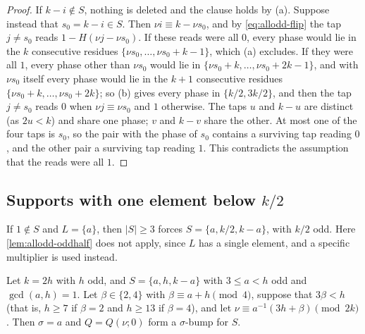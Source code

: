 \begin{proof}
If $k-i\notin S$, nothing is deleted and the clause holds by (a). Suppose
instead that $s_0=k-i\in S$. Then $\nu i\equiv k-\nu s_0$, and by
\eqref{eq:allodd-flip} the tap $j\ne s_0$ reads $1-H(\nu j-\nu s_0)$. If these reads
were all $0$, every phase would lie in the $k$ consecutive residues
$\{\nu s_0,\dots,\nu s_0+k-1\}$, which (a) excludes. If they were all $1$,
every phase other than $\nu s_0$ would lie in
$\{\nu s_0+k,\dots,\nu s_0+2k-1\}$, and with $\nu s_0$ itself every phase would lie in
the $k+1$ consecutive residues $\{\nu s_0+k,\dots,\nu s_0+2k\}$; so (b) gives
every phase in $\{k/2,3k/2\}$, and then the tap $j\ne s_0$ reads $0$ when
$\nu j\equiv \nu s_0$ and $1$ otherwise. The taps $u$ and $k-u$ are distinct (as
$2u<k$) and share one phase; $v$ and $k-v$ share the other. At most one of the
four taps is $s_0$, so the pair with the phase of $s_0$ contains a surviving
tap reading $0$, and the other pair a surviving tap reading $1$. This
contradicts the assumption that the reads were all $1$.
\end{proof}

\subsection{Supports with one element below \texorpdfstring{$k/2$}{k/2}}
\label{sec:allodd-three}

If $1\notin S$ and $L=\{a\}$, then $|S|\ge3$ forces $S=\{a,k/2,k-a\}$, with
$k/2$ odd. Here \autoref{lem:allodd-oddhalf} does not apply, since $L$ has a
single element, and a specific multiplier is used instead.

\begin{theorem}
\label{thm:allodd-threeall}
Let $k=2h$ with $h$ odd, and $S=\{a,h,k-a\}$ with $3\le a<h$ odd and
$\gcd(a,h)=1$. Let $\beta\in\{2,4\}$ with $\beta\equiv a+h\pmod4$, suppose
that $3\beta<h$ (that is, $h\ge7$ if $\beta=2$ and $h\ge13$ if $\beta=4$), and
let $\nu\equiv a^{-1}(3h+\beta)\pmod{2k}$. Then $\sigma=a$ and $Q=Q(\nu;0)$ form a
$\sigma$-bump for $S$.
\end{theorem}

